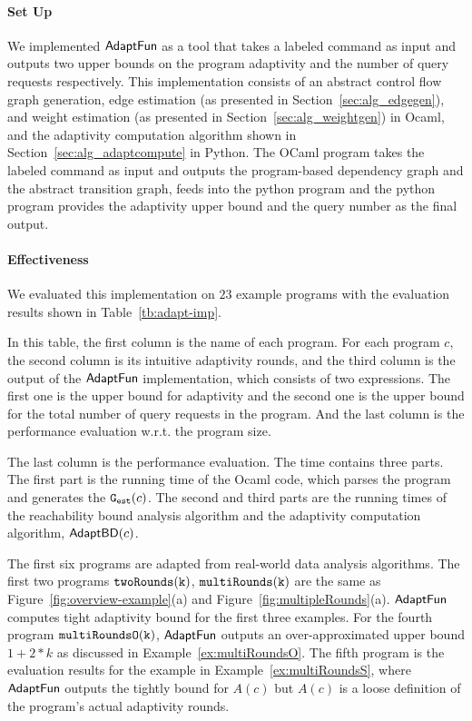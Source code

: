 
\paragraph{Set Up}
We implemented $\textsf{AdaptFun}$ as a tool that takes a labeled command as input 
and outputs two upper bounds on the program adaptivity and the number of query requests respectively.
This implementation consists of an 
abstract control flow graph generation,
edge estimation (as presented in Section~\ref{sec:alg_edgegen}), and weight estimation (as presented in Section~\ref{sec:alg_weightgen}) in Ocaml, 
and the adaptivity computation algorithm shown in Section~\ref{sec:alg_adaptcompute} in Python.
The OCaml program takes the labeled command as input and outputs the program-based dependency graph and
the abstract transition graph,
feeds into the python program and the python program provides the adaptivity upper bound and the query number as the final output.


\paragraph{Effectiveness}

We evaluated this implementation on $23$ example programs with the evaluation results shown in Table~\ref{tb:adapt-imp}.

In this table,
the first column is the name of each program.
For each program $c$, the second column is its intuitive adaptivity rounds,
and the third column is the output of the $\textsf{AdaptFun}$ implementation, which consists of two expressions.
The first one is the upper bound for adaptivity and the second one is the 
upper bound for the total number of query requests in the program. And the last column is the performance evaluation w.r.t. the program size.

The last column is the performance evaluation.
The time contains three parts. The first part is the running time of the Ocaml code, which parses the program and generates the $\mathtt{{G_{est}}}(c)$.
The second and third parts are the running times of the reachability bound analysis algorithm
and the adaptivity computation algorithm, $\mathsf{AdaptBD}(c)$.

The first six programs are adapted from real-world data analysis algorithms.
The first two programs $\mathtt{twoRounds(k)}$, $ \mathtt{multiRounds(k)}$ are the same as Figure~\ref{fig:overview-example}(a) and Figure~\ref{fig:multipleRounds}(a).
$\textsf{AdaptFun}$ computes tight adaptivity bound for the first three examples.
For the fourth program $\mathtt{multiRoundsO(k)}$, $\textsf{AdaptFun}$ outputs an over-approximated upper bound $1 + 2*k$ 
as discussed in Example~\ref{ex:multiRoundsO}. 
The fifth program is the evaluation results for the example in Example~\ref{ex:multiRoundsS}, where $\textsf{AdaptFun}$ outputs the tightly bound for $A(c)$ but $A(c)$ is a loose definition of the program's actual adaptivity rounds.
%


